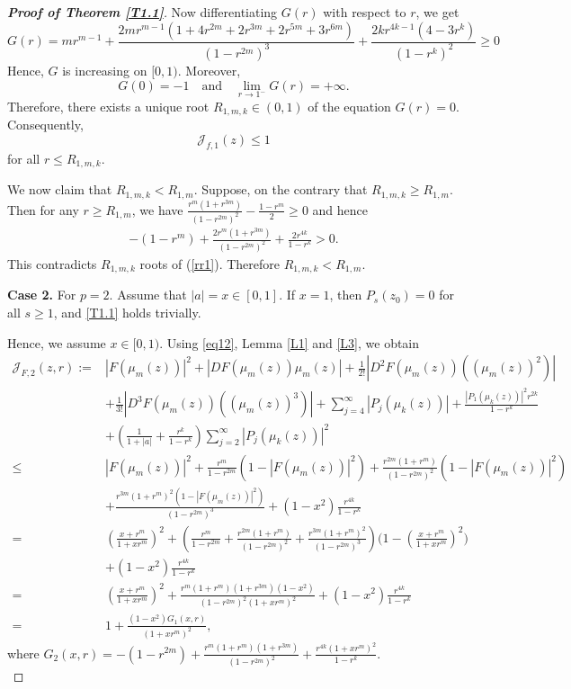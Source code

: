 \documentclass[11pt, reqno]{amsart}
\newtheorem*{cor A}{Corollary A}
\newtheorem*{cor B}{Corollary B}
\newcommand{\beas}{\begin{eqnarray*}}
\newcommand{\eeas}{\end{eqnarray*}}
\numberwithin{equation}{section}
\begin{document}
\begin{proof}[{\bf Proof of Theorem \ref{T1.1}}]
Now differentiating $G(r)$ with respect to $r$, we get 
\[G(r)=mr^{m-1}+\frac{2mr^{m-1}\left(1+4r^{2m}+2r^{3m}+2r^{5m}+3r^{6m}\right)}{(1-r^{2m})^3}+\frac{2k r^{4k-1}(4-3r^k)}{(1-r^k)^2}\geq 0\]
Hence, $G$ is increasing on $[0,1)$. Moreover,
\[
G(0)=-1
\quad\text{and}\quad
\lim_{r\to 1^-}G(r)=+\infty.
\]
Therefore, there exists a unique root $R_{1,m,k}\in(0,1)$ of the equation $G(r)=0$. Consequently,
\[
\mathcal{J}_{f,1}(z)\le 1\]
for all $r\le R_{1,m,k}$.


 
We now claim that $R_{1,m,k}<R_{1,m}$. Suppose, on the contrary that $R_{1,m,k}\geq R_{1,m}$. Then for any $r\geq R_{1,m}$, we have $\frac{r^m(1+r^{3m})}{(1-r^{2m})^2}-\frac{1-r^m}{2}\geq  0$ and hence 
\beas -(1-r^m)+\frac{2r^m(1+r^{3m})}{(1-r^{2m})^2}+\frac{2r^{4k}}{1-r^k}>0.\eeas
This contradicts $R_{1,m,k}$ roots of (\ref{rr1}). Therefore $R_{1,m,k}< R_{1,m}$.

\medskip

{\bf Case 2.} For $p=2$. Assume that $|a|=x\in[0,1]$. If $x=1$, then $P_s(z_0)=0$ for all $s\ge1$, and
\eqref{T1.1} holds trivially. 

Hence, we assume $x\in[0,1)$. Using  \eqref{eq12}, Lemma \ref{L1} and \ref{L3}, we obtain
\begin{align}
\mathcal{J}_{F,2}(z,r):=&|F(\mu_m(z))|^2+|D F(\mu_m(z))\mu_m(z)|+\frac{1}{2!}|D^2 F(\mu_m(z)) ((\mu_m(z))^2)|\nonumber\\
&+\frac{1}{3!}|D^3 F(\mu_m(z)) ((\mu_m(z))^3)|+\sum_{j=4}^{\infty} |P_j(\mu_k(z))| +\frac{|P_1(\mu_k(z))|^2r^{2k}}{1-r^k}
\nonumber\\
&+\left(\frac{1}{1+|a|}+\frac{r^k}{1-r^k}\right)
\sum_{j=2}^{\infty} |P_j(\mu_k(z))|^2\nonumber\\ 
\le & |F(\mu_m(z))|^2+\frac{r^m}{1-r^{2m}}(1-|F(\mu_m(z))|^2)+\frac{r^{2m}(1+r^m)}{(1-r^{2m})^2}(1-|F(\mu_m(z))|^2)\nonumber\\
&+\frac{r^{3m}(1+r^m)^2(1-|F(\mu_m(z))|^2)}{(1-r^{2m})^3}+(1-x^2)\frac{r^{4k}}{1-r^k} \nonumber\\
=& \left(\frac{x+r^m}{1+xr^m}\right)^2+\left(\frac{r^m}{1-r^{2m}}+\frac{r^{2m}(1+r^m)}{(1-r^{2m})^2}+\frac{r^{3m}(1+r^m)^2}{(1-r^{2m})^3}\right)\bigg(1-\left(\frac{x+r^m}{1+xr^m}\right)^2\bigg)\nonumber\\
&+(1-x^2)\frac{r^{4k}}{1-r^k}\nonumber\\
=& \left(\frac{x+r^m}{1+xr^m}\right)^2+\frac{r^m(1+r^m)(1+r^{3m})(1-x^2)}{(1-r^{2m})^2(1+xr^m)^2}+(1-x^2)\frac{r^{4k}}{1-r^k}\nonumber\\
=&1+\frac{(1-x^2)G_1(x,r)}{(1+xr^m)^2},\label{eq:G2}
\end{align}
where $G_2(x,r)=-(1-r^{2m})+\frac{r^m(1+r^m)(1+r^{3m})}{(1-r^{2m})^2}+\frac{r^{4k}(1+xr^m)^2}{1-r^k}$.\\


\end{proof}
\end{document}

